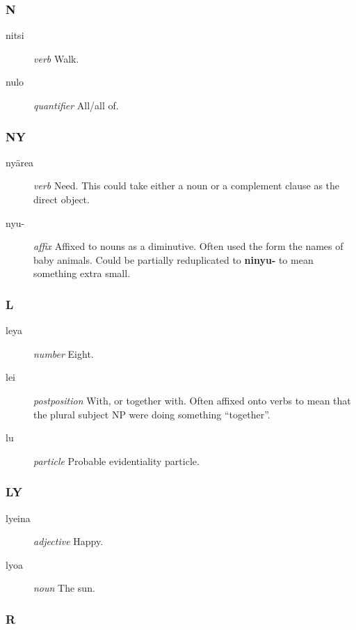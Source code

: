 \documentclass{article}
\begin{document}
\subsubsection{N}

\begin{description}
\item [nitsi] \emph{verb} Walk.
\item [nulo] \emph{quantifier} All/all of.
\end{description}

\subsubsection{NY}

\begin{description}
\item [ny\"area] \emph{verb} Need.  This could take either a noun or a complement clause as the direct object.
\item [nyu-] \emph{affix} Affixed to nouns as a diminutive.  Often used the form the names of baby animals.  Could be partially reduplicated to \textbf{ninyu-} to mean something extra small.
\end{description}

\subsubsection{L}

\begin{description}
\item [leya] \emph{number} Eight.
\item [lei] \emph{postposition} With, or together with.  Often affixed onto verbs to mean that the plural subject NP were doing something ``together''.
\item [lu] \emph{particle} Probable evidentiality particle.
\end{description}

\subsubsection{LY}

\begin{description}
\item [lyeina] \emph{adjective} Happy.
\item [lyoa] \emph{noun} The sun.
\end{description}

\subsubsection{R}
\end{document}
